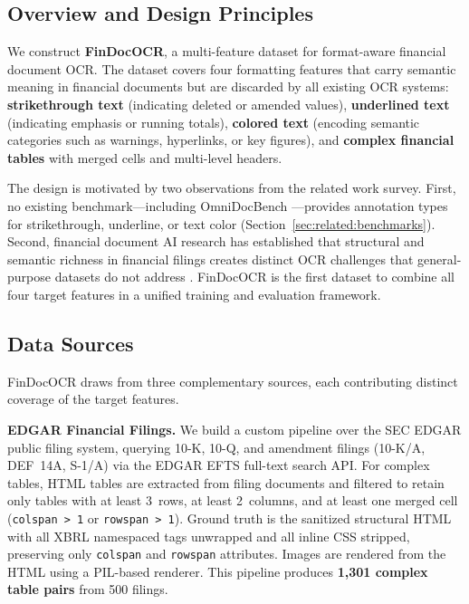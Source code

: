 \documentclass[10pt,twocolumn]{article}
\begin{document}
\subsection{Overview and Design Principles}
\label{sec:dataset:overview}

We construct \textbf{FinDocOCR}, a multi-feature dataset for format-aware
financial document OCR. The dataset covers four formatting features that carry
semantic meaning in financial documents but are discarded by all existing OCR
systems: \textbf{strikethrough text} (indicating deleted or amended values),
\textbf{underlined text} (indicating emphasis or running totals), \textbf{colored
text} (encoding semantic categories such as warnings, hyperlinks, or key
figures), and \textbf{complex financial tables} with merged cells and multi-level
headers.

The design is motivated by two observations from the related work survey. First,
no existing benchmark---including OmniDocBench \cite{ouyang2025omnidocbench}---provides
annotation types for strikethrough, underline, or text color
(Section~\ref{sec:related:benchmarks}). Second, financial document AI research
has established that structural and semantic richness in financial filings creates
distinct OCR challenges that general-purpose datasets do not address
\cite{chen2021finqa,zhu2021tatqa}. FinDocOCR is the first dataset to combine all
four target features in a unified training and evaluation framework.

\subsection{Data Sources}
\label{sec:dataset:sources}

FinDocOCR draws from three complementary sources, each contributing distinct
coverage of the target features.

\textbf{EDGAR Financial Filings.} We build a custom pipeline over the SEC EDGAR
public filing system, querying 10-K, 10-Q, and amendment filings (10-K/A,
DEF~14A, S-1/A) via the EDGAR EFTS full-text search API. For complex tables,
HTML tables are extracted from filing documents and filtered to retain only tables
with at least 3~rows, at least 2~columns, and at least one merged cell
(\texttt{colspan~>~1} or \texttt{rowspan~>~1}). Ground truth is the sanitized
structural HTML with all XBRL namespaced tags unwrapped and all inline CSS
stripped, preserving only \texttt{colspan} and \texttt{rowspan} attributes.
Images are rendered from the HTML using a PIL-based renderer. This pipeline
produces \textbf{1{,}301 complex table pairs} from 500 filings.
\end{document}
